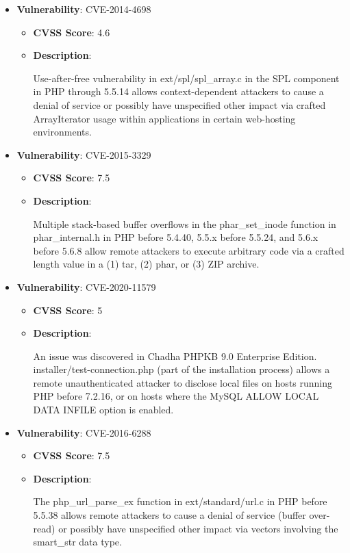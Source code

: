 \documentclass{article}
\begin{document}
\begin{itemize}
        \item \textbf{Vulnerability}: CVE-2014-4698
        \begin{itemize}
            \item \textbf{CVSS Score}:  4.6 
            \item \textbf{Description}:
            \parbox[t]{0.9\linewidth}{
                \ttfamily Use-after-free vulnerability in ext/spl/spl\_array.c in the SPL component in PHP through 5.5.14 allows context-dependent attackers to cause a denial of service or possibly have unspecified other impact via crafted ArrayIterator usage within applications in certain web-hosting environments.
            }
        \end{itemize}
    
        \item \textbf{Vulnerability}: CVE-2015-3329
        \begin{itemize}
            \item \textbf{CVSS Score}:  7.5 
            \item \textbf{Description}:
            \parbox[t]{0.9\linewidth}{
                \ttfamily Multiple stack-based buffer overflows in the phar\_set\_inode function in phar\_internal.h in PHP before 5.4.40, 5.5.x before 5.5.24, and 5.6.x before 5.6.8 allow remote attackers to execute arbitrary code via a crafted length value in a (1) tar, (2) phar, or (3) ZIP archive.
            }
        \end{itemize}
    
        \item \textbf{Vulnerability}: CVE-2020-11579
        \begin{itemize}
            \item \textbf{CVSS Score}:  5 
            \item \textbf{Description}:
            \parbox[t]{0.9\linewidth}{
                \ttfamily An issue was discovered in Chadha PHPKB 9.0 Enterprise Edition. installer/test-connection.php (part of the installation process) allows a remote unauthenticated attacker to disclose local files on hosts running PHP before 7.2.16, or on hosts where the MySQL ALLOW LOCAL DATA INFILE option is enabled.
            }
        \end{itemize}
    
        \item \textbf{Vulnerability}: CVE-2016-6288
        \begin{itemize}
            \item \textbf{CVSS Score}:  7.5 
            \item \textbf{Description}:
            \parbox[t]{0.9\linewidth}{
                \ttfamily The php\_url\_parse\_ex function in ext/standard/url.c in PHP before 5.5.38 allows remote attackers to cause a denial of service (buffer over-read) or possibly have unspecified other impact via vectors involving the smart\_str data type.
            }
        \end{itemize}
    

\end{itemize}
\end{document}
